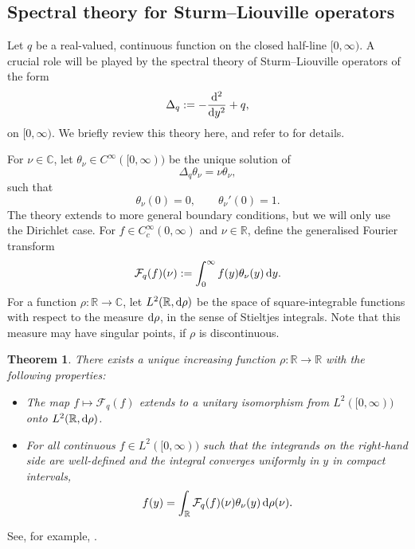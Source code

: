 \documentclass[10pt,a4paper]{amsart}
\numberwithin{equation}{section}
\newtheorem{Theorem}{Theorem}[section]
\newcommand{\R}{\mathbb{R}}
\newcommand{\C}{\mathbb{C}}
\newcommand{\cF}{\mathcal{F}}
\begin{document}
\subsection{Spectral theory for Sturm--Liouville operators}

Let $q$ be a real-valued, continuous function on the closed half-line $[0, \infty)$.
A crucial role will be played by the spectral theory of Sturm--Liouville operators of the form
\[
\Delta_{q}:= -\frac{{\rm d}^2}{{\rm d}y^2} + q,
\]
on $[0, \infty)$.
We briefly review this theory here, and refer to \cite{Levitan91, Titchmarsh62} for details.


For $\nu \in \C$, let $\theta_{\nu} \in C^{\infty}([0,\infty))$ be the unique solution of
\[
\Delta_{q}\theta_{\nu} = \nu \theta_{\nu},
\]
such that
\begin{equation} \label{eq Dirichlet}
\theta_{\nu}(0) = 0, \qquad
\theta_{\nu}'(0) = 1.
\end{equation}
The theory extends to more general boundary conditions, but we will only use the Dirichlet case. For $f \in C^{\infty}_c(0,\infty)$ and $\nu \in \R$, define the generalised Fourier transform
\[
\cF_q(f)(\nu):= \int_0^{\infty} f(y) \theta_{\nu} (y)\, {\rm d}y.
\]
 For a function $\rho\colon \R \to \C$, let $L^2(\R, {\rm d}\rho)$ be the space of square-integrable functions with respect to the measure ${\rm d}\rho$, in the sense of Stieltjes integrals. Note that this measure may have singular points, if $\rho$ is discontinuous.
 \begin{Theorem}\label{thm spec decomp}
 There exists a unique increasing function $\rho\colon \R \to \R$ with the following prop\-erties:
 \begin{itemize}\itemsep=0pt
 \item[$(a)$]
 The map $f \mapsto \cF_q(f)$ extends to a unitary isomorphism from $L^2([0,\infty))$ onto $L^2(\R, {\rm d}\rho)$.
 \item[$(b)$]
 For all continuous $f \in L^2([0,\infty))$ such that the integrands on the right-hand side are well-defined and the integral converges uniformly in $y$ in compact intervals,
 \begin{equation} \label{eq inversion}
 f(y) = \int_{\R} \cF_q(f)(\nu) \theta_{\nu}(y)\,{\rm d}\rho(\nu).
 \end{equation}
 \end{itemize}
 \end{Theorem}
 See, for example, \cite[Theorems~2.1.1 and 2.1.2]{Levitan91}.
\end{document}
